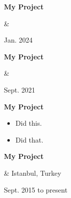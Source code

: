 \documentclass[10pt, letterpaper]{article}
\newenvironment{highlights}{
        \begin{itemize}[
                topsep=0pt,
                parsep=0.10 cm,
                partopsep=0pt,
                itemsep=0pt,
                after=\vspace{-1\baselineskip},
                leftmargin=0.4 cm + 3pt
            ]
    }{
        \end{itemize}
    } %
\let\originalTabularx\tabularx
\let\originalEndTabularx\endtabularx
\renewenvironment{tabularx}{\bgroup\centering\originalTabularx}{\originalEndTabularx\par\egroup}
\begin{document}
        \vspace{0.2 cm}
        \begin{tabularx}{
            \textwidth-0.4 cm-0.13cm
        }{
            K{0.2 cm}
            R{4.1 cm}
        }
            \textbf{My Project}

            \vspace{0.10 cm}

            &
            

            Jan. 2024
        \end{tabularx}


        \vspace{0.2 cm}
        \begin{tabularx}{
            \textwidth-0.4 cm-0.13cm
        }{
            K{0.2 cm}
            R{4.1 cm}
        }
            \textbf{My Project}

            \vspace{0.10 cm}

            &
            

            Sept. 2021
        \end{tabularx}


        \vspace{0.2 cm}
        \begin{tabularx}{
            \textwidth-0.4 cm-0.13cm
        }{
            K{0.2 cm}
        }
            \textbf{My Project}

            \vspace{0.10 cm}

            \begin{highlights}
                \item Did this.
                \item Did that.
            \end{highlights}
        \end{tabularx}


        \vspace{0.2 cm}
        \begin{tabularx}{
            \textwidth-0.4 cm-0.13cm
        }{
            K{0.2 cm}
            R{4.1 cm}
        }
            \textbf{My Project}

            \vspace{0.10 cm}

            &
            Istanbul, Turkey

            Sept. 2015 to present
        \end{tabularx}
\end{document}

